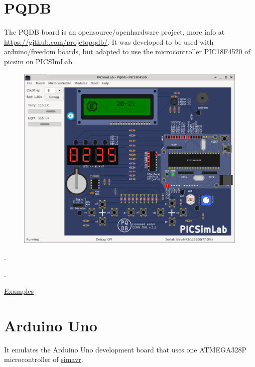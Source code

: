 \section{PQDB}

The PQDB board is an opensource/openhardware project, more info at \href{https://github.com/projetopqdb/}{https://github.com/projetopqdb/}.
It was developed to be used with arduino/freedom boards, but adapted to use the microcontroller PIC18F4520 of 
\href{https://github.com/lcgamboa/picsim}{picsim} on PICSImLab.

\begin{figure}[H]
\center
\includegraphics[width=0.99\textwidth]{img/board_PQDB.png} 
\end{figure} 

.\vspace{0.5cm}

.\vspace{0.5cm}


\href{https://lcgamboa.github.io/picsimlab_examples/board_PQDB.html}{Examples}


\section{Arduino Uno}

It emulates the Arduino Uno development board that uses one ATMEGA328P microcontroller of \href{https://github.com/buserror/simavr}{simavr}.

